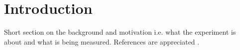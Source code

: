 \section{Introduction}\label{sec:intro}
Short section on the background and motivation i.e. what the experiment is about and what is being measured.
References are appreciated \cite{lab-manual}.
